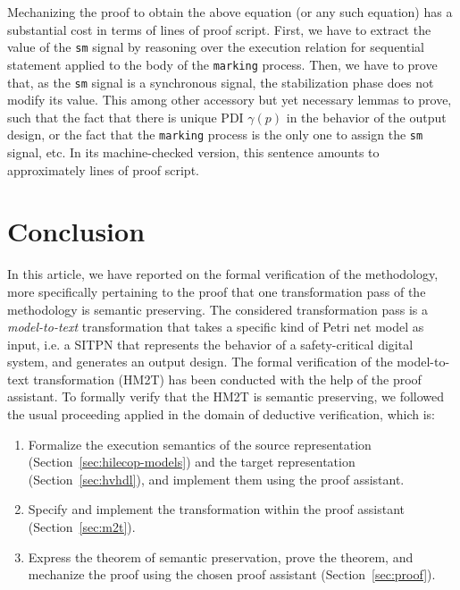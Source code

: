 \documentclass[pdflatex,sn-mathphys]{sn-jnl}%
\theoremstyle{thmstyleone}%
\theoremstyle{thmstyletwo}%
\theoremstyle{thmstylethree}%
\begin{document}
Mechanizing the proof to obtain the above equation (or any such
equation) has a substantial cost in terms of lines of proof
script. First, we have to extract the value of the \texttt{sm} signal
by reasoning over the execution relation for sequential statement
applied to the body of the \texttt{marking} process. Then, we have to
prove that, as the \texttt{sm} signal is a synchronous signal, the
stabilization phase does not modify its value. This among other
accessory but yet necessary lemmas to prove, such that the fact that
there is unique PDI $\gamma(p)$ in the behavior of the output design,
or the fact that the \texttt{marking} process is the only one to
assign the \texttt{sm} signal, etc. In its machine-checked version,
this sentence amounts to approximately  lines of proof script.

\section{Conclusion}
\label{sec:concl}

In this article, we have reported on the formal verification of the
\hilecop{} methodology, more specifically pertaining to the proof that
one transformation pass of the methodology is semantic preserving.
The considered transformation pass is a \textit{model-to-text}
transformation that takes a specific kind of Petri net model as input,
i.e. a SITPN that represents the behavior of a safety-critical digital
system, and generates an output \vhdl{} design. The formal
verification of the \hilecop{} model-to-text transformation (HM2T) has
been conducted with the help of the \coq{} proof assistant.  To
formally verify that the HM2T is semantic preserving, we followed the
usual proceeding applied in the domain of deductive verification,
which is:
\begin{enumerate}
\item Formalize the execution semantics of the source representation
  (Section~\ref{sec:hilecop-models}) and the target representation
  (Section~\ref{sec:hvhdl}), and implement them using the proof
  assistant.
\item Specify and implement the transformation within the proof
  assistant (Section~\ref{sec:m2t}).
\item Express the theorem of semantic preservation, prove the theorem,
  and mechanize the proof using the chosen proof assistant
  (Section~\ref{sec:proof}).
\end{enumerate}
\end{document}
